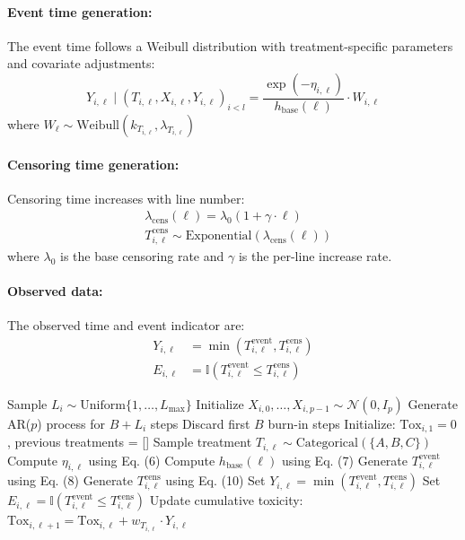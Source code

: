 \documentclass{article}
\begin{document}
\paragraph{Event time generation:}
The event time follows a Weibull distribution with treatment-specific parameters and covariate adjustments:
$$
    Y_{i,\ell} \mid (T_{i,\ell}, X_{i,\ell}, Y_{i,\ell})_{i<l} = \frac{\exp(-\eta_{i,\ell})}{h_{\text{base}}(\ell)} \cdot W_{i,\ell}
$$
where $W_\ell \sim \text{Weibull}(k_{T_{i,\ell}}, \lambda_{T_{i,\ell}})$
\paragraph{Censoring time generation:}
Censoring time increases with line number:
\begin{align*}
    &\lambda_{\text{cens}}(\ell) = \lambda_0 (1 + \gamma \cdot \ell) \\
    &T_{i,\ell}^{\text{cens}} \sim \text{Exponential}(\lambda_{\text{cens}}(\ell))
\end{align*}
where $\lambda_0$ is the base censoring rate and $\gamma$ is the per-line increase rate.
\paragraph{Observed data:}
The observed time and event indicator are:
\begin{align*}
    Y_{i,\ell} &= \min(T_{i,\ell}^{\text{event}}, T_{i,\ell}^{\text{cens}}) \\
    E_{i,\ell} &= \mathbb{I}(T_{i,\ell}^{\text{event}} \leq T_{i,\ell}^{\text{cens}})
\end{align*}
\begin{algorithm}
\caption{Multi-Line Survival Data Generation}
\begin{algorithmic}[1]
    \State Sample $L_i \sim \text{Uniform}\{1, \ldots, L_{\max}\}$
    \State Initialize $X_{i,0}, \ldots, X_{i,p-1} \sim \mathcal{N}(0, I_p)$
    \State Generate AR($p$) process for $B + L_i$ steps
    \State Discard first $B$ burn-in steps
    \State Initialize: $\text{Tox}_{i,1} = 0$, previous treatments = []
        \State Sample treatment $T_{i,\ell} \sim \text{Categorical}(\{A, B, C\})$
        \State Compute $\eta_{i,\ell}$ using Eq. (6)
        \State Compute $h_{\text{base}}(\ell)$ using Eq. (7)
        \State Generate $T_{i,\ell}^{\text{event}}$ using Eq. (8)
        \State Generate $T_{i,\ell}^{\text{cens}}$ using Eq. (10)
        \State Set $Y_{i,\ell} = \min(T_{i,\ell}^{\text{event}}, T_{i,\ell}^{\text{cens}})$
        \State Set $E_{i,\ell} = \mathbb{I}(T_{i,\ell}^{\text{event}} \leq T_{i,\ell}^{\text{cens}})$
        \State Update cumulative toxicity: $\text{Tox}_{i,\ell+1} = \text{Tox}_{i,\ell} + w_{T_{i,\ell}} \cdot Y_{i,\ell}$
    \EndFor
\EndFor
\end{algorithmic}
\end{algorithm}
\end{document}
